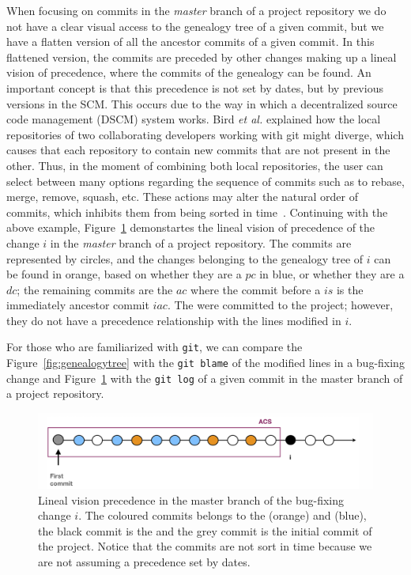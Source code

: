 \documentclass[a4paper, 12pt]{book}
\begin{document}
When focusing on commits in the \emph{master} branch of a project repository we do not have a clear visual access to the genealogy tree of a given commit, but we have a flatten version of all the ancestor commits of a given commit. In this flattened version, the commits are preceded by other changes making up a lineal vision of precedence, where the commits of the genealogy can be found. An important concept is that this precedence is not set by dates, but by previous versions in the SCM. This occurs due to the way in which a decentralized source code management (DSCM) system works. Bird \emph{et al.} explained how the local repositories of two collaborating developers working with git might diverge, which causes that each repository to contain new commits that are not present in the other. Thus, in the moment of combining both local repositories, the user can select between many options regarding the sequence of commits such as to rebase, merge, remove, squash, etc. These actions may alter the natural order of commits, which inhibits them from being sorted in time~\cite{bird2009promises}. Continuing with the above example, Figure~\ref{fig:precedence} demonstartes the lineal vision of precedence of the change $i$ in the \emph{master} branch of a project repository. The commits are represented by circles, and the changes belonging to the genealogy tree of $i$ can be found in orange, based on whether they are a $pc$ in blue, or whether they are a $dc$; the remaining commits are the $ac$ where the commit before a $is$ is the immediately ancestor commit $iac$. The  were committed to the project; however, they do not have a precedence relationship with the lines modified in $i$.    

For those who are familiarized with \texttt{git}, we can compare the Figure~\ref{fig:genealogytree} with the \texttt{git blame} of the modified lines in a bug-fixing change and Figure~\ref{fig:precedence} with the \texttt{git log} of a given commit in the master branch of a project repository. 

\begin{figure}[ht]
\centering
\includegraphics[width=\columnwidth]{img/visionlog.png}
\caption{Lineal vision precedence in the master branch of the bug-fixing change $i$. The coloured commits belongs to the  (orange) and  (blue), the black commit is the \BFC and the grey commit is the initial commit of the project. Notice that the commits are not sort in time because we are not assuming a precedence set by dates.}
\label{fig:precedence}       %
\end{figure}
\end{document}
